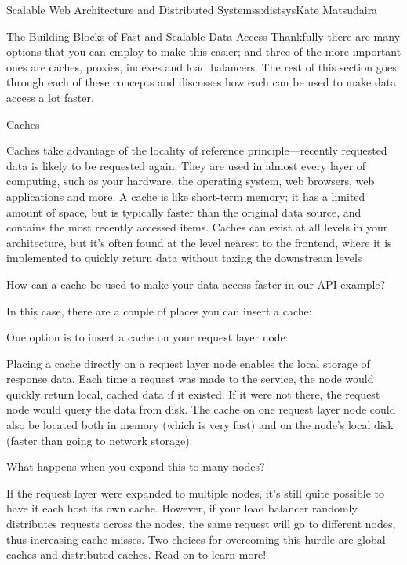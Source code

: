 \begin{aosachapter}{Scalable Web Architecture and Distributed Systems}{s:distsys}{Kate Matsudaira}
\begin{aosasect1}{The Building Blocks of Fast and Scalable Data Access}
Thankfully there are many options that you can employ to make this
easier; and three of the more important ones are caches, proxies,
indexes and load balancers. The rest of this section goes through each
of these concepts and discusses how each can be used to make data
access a lot faster.

\begin{aosasect2}{Caches}

Caches take advantage of the locality of reference
principle---recently requested data is likely to be requested
again. They are used in almost every layer of computing, such as your
hardware, the operating system, web browsers, web applications and
more. A cache is like short-term memory; it has a limited amount of
space, but is typically faster than the original data source, and
contains the most recently accessed items. Caches can exist at all
levels in your architecture, but it's often found at the level nearest
to the frontend, where it is implemented to quickly return data
without taxing the downstream levels

How can a cache be used to make your data access faster in our API
example?

In this case, there are a couple of places you can insert a cache:

One option is to insert a cache on your request layer node:


Placing a cache directly on a request layer node enables the local
storage of response data. Each time a request was made to the service,
the node would quickly return local, cached data if it existed. If it
were not there, the request node would query the data from disk. The
cache on one request layer node could also be located both in memory
(which is very fast) and on the node's local disk (faster than going
to network storage).

What happens when you expand this to many nodes?


If the request layer were expanded to multiple nodes, it's still quite
possible to have it each host its own cache. However, if your load
balancer randomly distributes requests across the nodes, the same
request will go to different nodes, thus increasing cache misses. Two
choices for overcoming this hurdle are global caches and distributed
caches. Read on to learn more!


\end{aosasect2}
\end{aosasect1}
\end{aosachapter}
